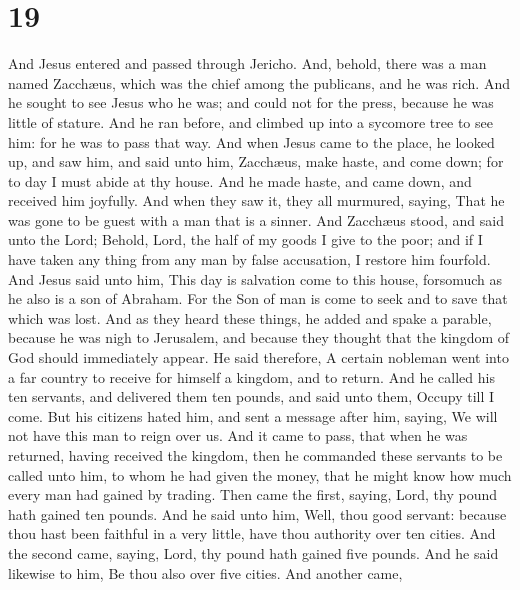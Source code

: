 \hypertarget{section-18}{%
\section{19}\label{section-18}}

 And Jesus entered and passed through Jericho. 
And, behold, there was a man named Zacchæus, which was the chief among
the publicans, and he was rich.  And he sought to see Jesus
who he was; and could not for the press, because he was little of
stature.  And he ran before, and climbed up into a sycomore
tree to see him: for he was to pass that way.  And when
Jesus came to the place, he looked up, and saw him, and said unto him,
Zacchæus, make haste, and come down; for to day I must abide at thy
house.  And he made haste, and came down, and received him
joyfully.  And when they saw it, they all murmured, saying,
That he was gone to be guest with a man that is a sinner. 
And Zacchæus stood, and said unto the Lord; Behold, Lord, the half of my
goods I give to the poor; and if I have taken any thing from any man by
false accusation, I restore him fourfold.  And Jesus said
unto him, This day is salvation come to this house, forsomuch as he also
is a son of Abraham.  For the Son of man is come to seek
and to save that which was lost.  And as they heard these
things, he added and spake a parable, because he was nigh to Jerusalem,
and because they thought that the kingdom of God should immediately
appear.  He said therefore, A certain nobleman went into a
far country to receive for himself a kingdom, and to return.
 And he called his ten servants, and delivered them ten
pounds, and said unto them, Occupy till I come.  But his
citizens hated him, and sent a message after him, saying, We will not
have this man to reign over us.  And it came to pass, that
when he was returned, having received the kingdom, then he commanded
these servants to be called unto him, to whom he had given the money,
that he might know how much every man had gained by trading.
 Then came the first, saying, Lord, thy pound hath gained
ten pounds.  And he said unto him, Well, thou good servant:
because thou hast been faithful in a very little, have thou authority
over ten cities.  And the second came, saying, Lord, thy
pound hath gained five pounds.  And he said likewise to
him, Be thou also over five cities.  And another came,
